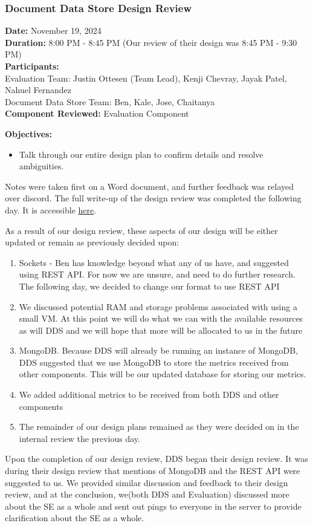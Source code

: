 \subsubsection*{Document Data Store Design Review}

\textbf{Date:} November 19, 2024 \\
\textbf{Duration:} 8:00 PM - 8:45 PM (Our review of their design was 8:45 PM - 9:30 PM)\\
\textbf{Participants:} \\
Evaluation Team: Justin Ottesen (Team Lead), Kenji Chevray, Jayak Patel, Nahuel Fernandez \\
Document Data Store Team: Ben, Kale, Jose, Chaitanya \\
\textbf{Component Reviewed:} Evaluation Component

\medskip

\textbf{Objectives:}
\begin{itemize}
  \item Talk through our entire design plan to confirm details and resolve ambiguities. 
\end{itemize}

Notes were taken first on a Word document, and further feedback was relayed over discord. The full write-up of the design review was completed the following day. It is accessible \href{https://docs.google.com/document/d/1REwOedsmrtoQbACQpFj3Ti8JiCDlrIysBp8OR26vRdU/edit?tab=t.0}{here}.

\medskip

As a result of our design review, these aspects of our design will be either updated or remain as previously decided upon:
\begin{enumerate}
  \item Sockets - Ben has knowledge beyond what any of us have, and suggested using REST API. For now we are unsure, and need to do further research. The following day, we decided to change our format to use REST API
  \item We discussed potential RAM and storage problems associated with using a small VM. At this point we will do what we can with the available resources as will DDS and we will hope that more will be allocated to us in the future
  \item MongoDB. Because DDS will already be running an instance of MongoDB, DDS suggested that we use MongoDB to store the metrics received from other components. This will be our updated database for storing our metrics. 
  \item We added additional metrics to be received from both DDS and other components
  \item The remainder of our design plans remained as they were decided on in the internal review the previous day.
\end{enumerate}
Upon the completion of our design review, DDS began their design review. It was during their design review that mentions of MongoDB and the REST API were suggested to us. We provided similar discussion and feedback to their design review, and at the conclusion, we(both DDS and Evaluation) discussed more about the SE as a whole and sent out pings to everyone in the server to provide clarification about the SE as a whole.
